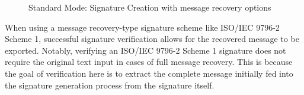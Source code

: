 \documentclass[]{final_report}
\begin{document}
\begin{figure}[H]
\begin{minipage}{0.49\textwidth}
       \caption{Standard Mode: Signature Creation with message recovery options}
        \label{fig:image2}
    \end{minipage}
\end{figure}

When using a message recovery-type signature scheme like ISO/IEC 9796-2 Scheme 1, successful signature verification allows for the recovered message to be exported. Notably, verifying an ISO/IEC 9796-2 Scheme 1 signature does not require the original text input in cases of full message recovery. This is because the goal of verification here is to extract the complete message initially fed into the signature generation process from the signature itself.
\end{document}
